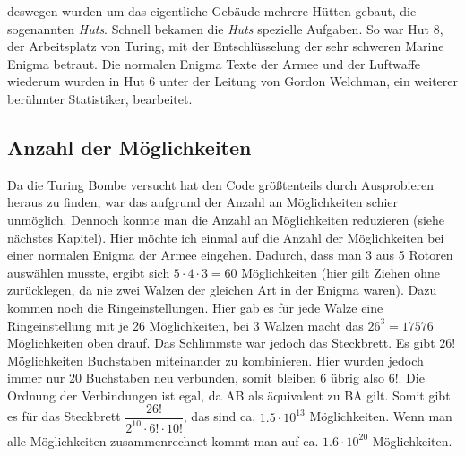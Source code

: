 deswegen wurden um das eigentliche Gebäude mehrere Hütten gebaut, die sogenannten \emph{Huts}. Schnell bekamen die \emph{Huts} spezielle Aufgaben. So war Hut 8, der Arbeitsplatz von Turing, mit der Entschlüsselung der sehr schweren Marine Enigma betraut. Die normalen Enigma Texte der Armee und der Luftwaffe wiederum wurden in Hut 6 unter der Leitung von Gordon Welchman, ein weiterer berühmter Statistiker, bearbeitet. \cite{enigmaproblem1} \cite{theessentialturing}

\subsection{Anzahl der Möglichkeiten}
Da die Turing Bombe versucht hat den Code größtenteils durch Ausprobieren heraus zu finden, war das aufgrund der Anzahl an Möglichkeiten schier unmöglich. Dennoch konnte man die Anzahl an Möglichkeiten reduzieren (siehe nächstes Kapitel). Hier möchte ich einmal auf die Anzahl der Möglichkeiten bei einer normalen Enigma der Armee eingehen. Dadurch, dass man 3 aus 5 Rotoren auswählen musste, ergibt sich $5 \cdot 4 \cdot 3 = 60$ Möglichkeiten (hier gilt Ziehen ohne zurücklegen, da nie zwei Walzen der gleichen Art in der Enigma waren). Dazu kommen noch die Ringeinstellungen. Hier gab es für jede Walze eine Ringeinstellung mit je 26 Möglichkeiten, bei 3 Walzen macht das $26^3 = 17576$ Möglichkeiten oben drauf. Das Schlimmste war jedoch das Steckbrett. Es gibt $26!$ Möglichkeiten Buchstaben miteinander zu kombinieren. Hier wurden jedoch immer nur 20 Buchstaben neu verbunden, somit bleiben 6 übrig also $6!$. Die Ordnung der Verbindungen ist egal, da AB als äquivalent zu BA gilt. Somit gibt es für das Steckbrett $\dfrac{26!}{2^{10}\cdot6!\cdot10!}$, das sind ca. $1.5 \cdot 10^{13}$ Möglichkeiten. Wenn man alle Möglichkeiten zusammenrechnet kommt man auf ca. $1.6 \cdot 10^{20}$ Möglichkeiten. \cite{emach}

